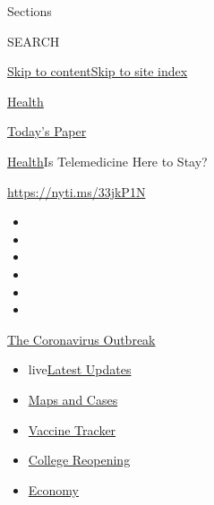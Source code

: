 Sections

SEARCH

\protect\hyperlink{site-content}{Skip to
content}\protect\hyperlink{site-index}{Skip to site index}

\href{https://www.nytimes.com/section/health}{Health}

\href{https://myaccount.nytimes.com/auth/login?response_type=cookie\&client_id=vi}{}

\href{https://www.nytimes.com/section/todayspaper}{Today's Paper}

\href{/section/health}{Health}\textbar{}Is Telemedicine Here to Stay?

\url{https://nyti.ms/33jkP1N}

\begin{itemize}
\item
\item
\item
\item
\item
\item
\end{itemize}

\href{https://www.nytimes.com/news-event/coronavirus?action=click\&pgtype=Article\&state=default\&region=TOP_BANNER\&context=storylines_menu}{The
Coronavirus Outbreak}

\begin{itemize}
\tightlist
\item
  live\href{https://www.nytimes.com/2020/08/03/world/coronavirus-covid-19.html?action=click\&pgtype=Article\&state=default\&region=TOP_BANNER\&context=storylines_menu}{Latest
  Updates}
\item
  \href{https://www.nytimes.com/interactive/2020/us/coronavirus-us-cases.html?action=click\&pgtype=Article\&state=default\&region=TOP_BANNER\&context=storylines_menu}{Maps
  and Cases}
\item
  \href{https://www.nytimes.com/interactive/2020/science/coronavirus-vaccine-tracker.html?action=click\&pgtype=Article\&state=default\&region=TOP_BANNER\&context=storylines_menu}{Vaccine
  Tracker}
\item
  \href{https://www.nytimes.com/2020/08/02/us/covid-college-reopening.html?action=click\&pgtype=Article\&state=default\&region=TOP_BANNER\&context=storylines_menu}{College
  Reopening}
\item
  \href{https://www.nytimes.com/live/2020/08/03/business/stock-market-today-coronavirus?action=click\&pgtype=Article\&state=default\&region=TOP_BANNER\&context=storylines_menu}{Economy}
\end{itemize}

